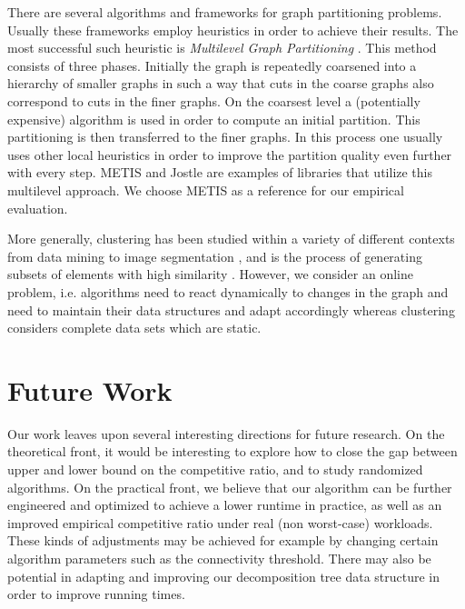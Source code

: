 \documentclass[a4paper,UKenglish,cleveref, autoref, thm-restate,authorcolumns]{lipics-v2019}
\begin{document}
There are several algorithms and frameworks for graph partitioning problems. Usually these frameworks employ heuristics in order to achieve their results. The most successful such heuristic is \textit{Multilevel Graph Partitioning} \cite{Buluc2016}. This method consists of three phases. Initially the graph is repeatedly coarsened into a hierarchy of smaller graphs in such a way that cuts in the coarse graphs also correspond to cuts in the finer graphs. On the coarsest level a (potentially expensive) algorithm is used in order to compute an initial partition. This partitioning is then transferred to the finer graphs. In this process one usually uses other local heuristics in order to improve the partition quality even further with every step.
METIS \cite{Karypis1998, Karypis1998a} and Jostle \cite{Walshaw2000, walshaw2007jostle} are examples of libraries that utilize this multilevel approach. We choose METIS as a reference for our empirical evaluation.

More generally, clustering has been studied within a variety of
different contexts 
from data mining to image segmentation \cite{Benabdellah2019, Wu1993, Pavana},
and is the process of generating subsets of elements with high similarity 
\cite{Hartuv2000}. 
However, we consider an online problem, i.e. algorithms need to react dynamically to changes in the graph and need to maintain their data structures and adapt accordingly whereas clustering considers complete data sets which are static.

\section{Future Work}
	\label{sec:future_work}
	
Our work leaves upon several interesting directions for future
research. 
On the theoretical front, it would be interesting to explore
how to close the gap between upper and lower bound
on the competitive ratio, and to study randomized algorithms.
On the practical front, we believe that our algorithm can
be further engineered and optimized to achieve a lower runtime
in practice, as well as an improved empirical competitive ratio
under real (non worst-case) workloads.
These kinds of adjustments may be achieved for example by changing certain algorithm parameters such as the connectivity threshold.
There may also be potential in adapting and improving our decomposition tree data structure in order to improve running times.
\end{document}
